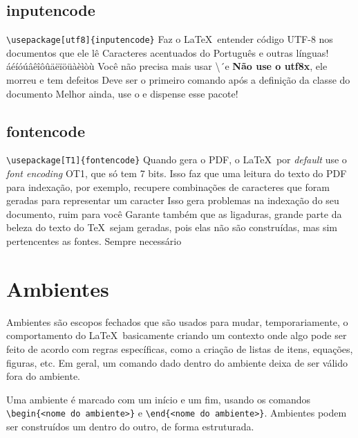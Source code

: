 \subsection{inputencode}
    \begin{outline}
        \1 \lstinline|\usepackage[utf8]{inputencode}|
        \1 Faz o \LaTeX\ entender código UTF-8 nos documentos que ele lê\parencite{Jeffrey:2013}
        \2 Caracteres acentuados do Português e outras línguas!
        \3 áéíóúâêîôûäëïöüàèìòù
        \1 Você não precisa mais usar \textbackslash´e
        \1 \textbf{Não use o utf8x}, ele morreu e tem defeitos
        \1 Deve ser o primeiro comando após a definição da classe do documento
        \1 Melhor ainda, use o  e dispense esse pacote!
    \end{outline}

\subsection{fontencode}
    \begin{outline}
        \1 \lstinline|\usepackage[T1]{fontencode}|
        \1 Quando gera o PDF, o \LaTeX\ por \textit{default} use o \textit{font encoding} OT1, que só tem 7 bits.
        \2 Isso faz que uma leitura do texto do PDF para indexação, por exemplo, recupere combinações de caracteres que foram geradas para representar um caracter
        \3 Isso gera problemas na indexação do seu documento, ruim para você
        \1 Garante também que as ligaduras, grande parte da beleza do texto do \TeX\ sejam geradas, pois elas não são construídas, mas sim pertencentes as fontes.
        \1 Sempre necessário
    \end{outline}

\section{Ambientes}

   Ambientes são escopos fechados que são usados para mudar, temporariamente, o comportamento do \LaTeX\, basicamente criando um  contexto onde algo pode ser feito de acordo com
   regras específicas, como a criação de listas de itens,
   equações, figuras, etc.  Em geral, um comando dado dentro do ambiente deixa de ser válido fora do ambiente.
   
   
   Uma ambiente é marcado com um início e um fim, usando os
   comandos \lstinline|\begin{<nome do ambiente>}| e 
   \lstinline|\end{<nome do ambiente>}|. Ambientes podem
   ser construídos um dentro do outro, de forma estruturada.


